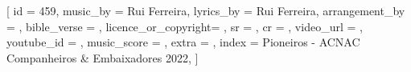 [
    id                  = {459},
    music_by            = {Rui Ferreira}, %
    lyrics_by           = {Rui Ferreira}, %
    arrangement_by      = {}, %
    bible_verse         = {},
    licence_or_copyright= {},
    sr                  = {},
    cr                  = {},
    video_url           = {}, %
    youtube_id          = {}, %
    music_score         = {}, %
    extra               = {},
    index               = {Pioneiros - ACNAC Companheiros & Embaixadores 2022},
]

